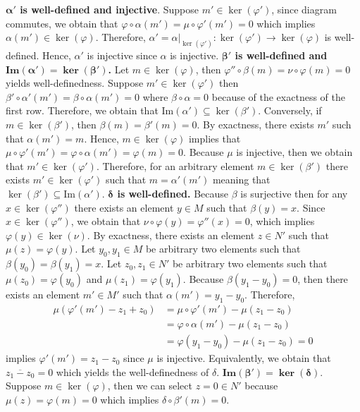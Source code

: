 \begin{solution}
    \textbf{$\bm{\alpha'}$ is well-defined and injective}. Suppose $m'\in\ker(\varphi')$, since diagram commutes, we obtain that $\varphi\circ \alpha(m')=\mu\circ\varphi'(m')=0$ which implies $\alpha(m')\in\ker(\varphi)$. 
    Therefore, $\alpha'= \alpha|_{\ker(\varphi')}:\ker(\varphi')\to \ker(\varphi)$ is well-defined. Hence, $\alpha'$ is injective since $\alpha$ is injective.
    \textbf{$\bm{\beta'}$ is well-defined and $\bm{\textbf{Im}(\alpha')=\ker(\beta')}$.}  Let $m\in\ker(\varphi)$, then $\varphi''\circ\beta(m)=\nu\circ \varphi(m)=0$ yields well-definedness. Suppose $m'\in\ker(\varphi')$ then $\beta'\circ\alpha'(m')=\beta\circ\alpha(m')=0$ where $\beta\circ\alpha=0$ because of 
    the exactness of the first row. Therefore, we obtain that $\text{Im}(\alpha')\subseteq\ker(\beta')$. Conversely, if $m\in\ker(\beta')$, then $\beta(m)=\beta'(m)=0$. By exactness, there exists $m'$ such that $\alpha(m')=m$. Hence, $m\in\ker(\varphi)$ implies that $\mu\circ\varphi'(m')= \varphi\circ\alpha(m')= \varphi(m)=0$. 
    Because $\mu$ is injective, then we obtain that $m'\in\ker(\varphi')$. Therefore, for an arbitrary element $m\in\ker(\beta')$ there exists $m'\in\ker(\varphi')$ such that $m=\alpha'(m')$ meaning that $\ker(\beta')\subseteq\text{Im}(\alpha')$.
    \textbf{$\bm{\delta}$ is well-defined.}
    Because $\beta$ is surjective then for any $x\in \ker(\varphi'')$ there exists an element $y\in M$ such that $\beta(y)=x$.
    Since $x\in\ker(\varphi'')$, we obtain that $\nu\circ\varphi(y)= \varphi''(x)=0$, which implies $\varphi(y)\in\ker(\nu)$. By exactness, 
    there exists an element $z\in N'$ such that $\mu(z)=\varphi(y)$.
    Let $y_0,y_1\in M $ be arbitrary two elements such that $\beta(y_0)=\beta(y_1)=x$. Let $z_0,z_1\in N'$ be arbitrary two elements such that $\mu(z_0)=\varphi(y_0)$ and $\mu(z_1)=\varphi(y_1)$.
    Because $\beta(y_1-y_0)= 0$, then there exists an element $m'\in M'$ such that $\alpha(m')=y_1-y_0$. Therefore, 
    \begin{align*}
        \mu(\varphi'(m')-z_1+z_0)&= \mu\circ \varphi'(m')-\mu(z_1-z_0) \\
        &= \varphi\circ\alpha(m')-\mu(z_1-z_0) \\
        &= \varphi(y_1-y_0) - \mu(z_1-z_0)=0
    \end{align*}
    implies $\varphi'(m')=z_1-z_0$ since $\mu$ is injective. Equivalently, we obtain that $\overline{z_1-z_0}=0$ which yields the well-definedness of $\delta$.
    \textbf{$\bm{\textbf{Im}(\beta')=\ker(\delta)}$}. Suppose $m\in\ker(\varphi)$, then we can select $z=0\in N'$ because $\mu(z)=\varphi(m)=0$ which implies $\delta\circ\beta'(m)=0$.

\end{solution}
